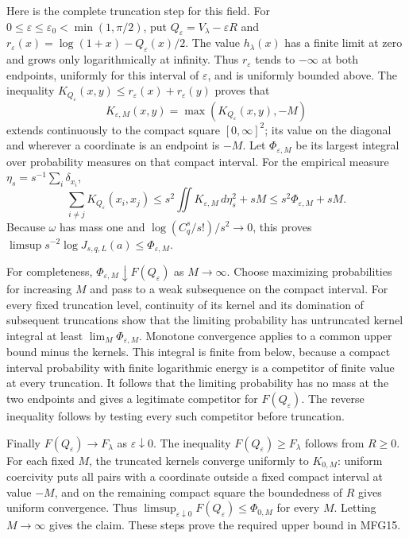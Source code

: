 Here is the complete truncation step for this field. For
$0\le\varepsilon\le\varepsilon_0<\min(1,\pi/2)$, put
$Q_\varepsilon=V_\lambda-\varepsilon R$ and
$r_\varepsilon(x)=\log(1+x)-Q_\varepsilon(x)/2$.
The value $h_\lambda(x)$ has a finite limit at zero and grows only
logarithmically at infinity. Thus $r_\varepsilon$ tends to $-\infty$
at both endpoints, uniformly for this interval of $\varepsilon$,
and is uniformly bounded above. The inequality
$K_{Q_\varepsilon}(x,y)\le r_\varepsilon(x)+r_\varepsilon(y)$ proves
that
\[
 K_{\varepsilon,M}(x,y)=\max(K_{Q_\varepsilon}(x,y),-M)
\]
extends continuously to the compact square $[0,\infty]^2$; its value
on the diagonal and wherever a coordinate is an endpoint is $-M$.
Let $\Phi_{\varepsilon,M}$ be its largest integral over probability
measures on that compact interval. For the empirical measure
$\eta_s=s^{-1}\sum_i\delta_{x_i}$,
\[
 \sum_{i\ne j}K_{Q_\varepsilon}(x_i,x_j)
 \le s^2\iint K_{\varepsilon,M}\,d\eta_s^2+sM
 \le s^2\Phi_{\varepsilon,M}+sM.
\]
Because $\omega$ has mass one and
$\log(C_q^s/s!)/s^2\to0$, this proves
$\limsup s^{-2}\log J_{s,q,L}(a)\le\Phi_{\varepsilon,M}$.

For completeness,
$\Phi_{\varepsilon,M}\downarrow F(Q_\varepsilon)$ as $M\to\infty$.
Choose maximizing probabilities for increasing $M$ and pass to a weak
subsequence on the compact interval. For every fixed truncation level,
continuity of its kernel and its domination of subsequent truncations
show that the limiting probability has untruncated kernel integral at
least $\lim_M\Phi_{\varepsilon,M}$. Monotone convergence applies to
a common upper bound minus the kernels. This integral is finite from
below, because a compact interval probability with finite logarithmic
energy is a competitor of finite value at every truncation. It follows
that the limiting probability has no mass at the two endpoints and
gives a legitimate competitor for $F(Q_\varepsilon)$. The reverse
inequality follows by testing every such competitor before truncation.

Finally $F(Q_\varepsilon)\to F_\lambda$ as $\varepsilon\downarrow0$.
The inequality $F(Q_\varepsilon)\ge F_\lambda$ follows from $R\ge0$.
For each fixed $M$, the truncated kernels converge uniformly to
$K_{0,M}$: uniform coercivity puts all pairs with a coordinate outside
a fixed compact interval at value $-M$, and on the remaining compact
square the boundedness of $R$ gives uniform convergence. Thus
$\limsup_{\varepsilon\downarrow0}F(Q_\varepsilon)
\le\Phi_{0,M}$ for every $M$. Letting $M\to\infty$ gives the claim.
These steps prove the required upper bound in MFG15.

